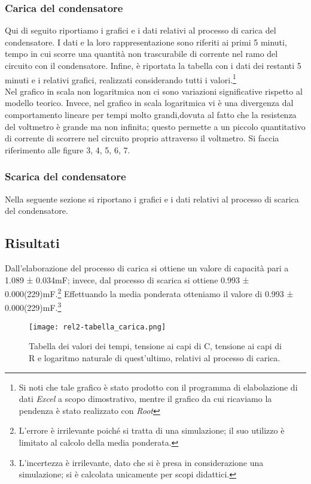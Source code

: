 \documentclass{article}
\begin{document}
\subsubsection{Carica del condensatore}
Qui di seguito riportiamo i grafici e i dati relativi al processo di carica del condensatore. I dati e la loro rappresentazione sono riferiti ai primi 5 minuti, tempo in cui scorre una quantità non trascurabile di corrente nel ramo del circuito con il condensatore. Infine, è riportata la tabella con i dati dei restanti 5 minuti e i relativi grafici, realizzati considerando tutti i valori.\footnote{Si noti che tale grafico è stato prodotto con il programma di elabolazione di dati \emph{Excel} a scopo dimostrativo, mentre il grafico da cui ricaviamo la pendenza è stato realizzato con \emph{Root}} \\ Nel grafico in scala non logaritmica non ci sono variazioni significative rispetto al modello teorico. Invece, nel grafico in scala logaritmica vi è una divergenza dal comportamento lineare per tempi molto grandi,dovuta al fatto che la resistenza del voltmetro è grande ma non infinita; questo permette a un piccolo quantitativo di corrente di scorrere nel circuito proprio attraverso il voltmetro. Si faccia riferimento alle figure 3, 4, 5, 6, 7.
\subsubsection{Scarica del condensatore}
Nella seguente sezione si riportano i grafici e i dati relativi al processo di scarica del condensatore.
\subsection{Risultati}
Dall’elaborazione del processo di carica si ottiene un valore di capacità pari a 1.089 ± 0.034mF; invece, dal processo di scarica si ottiene 0.993 ± 0.000(229)mF.\footnote{L’errore è irrilevante poiché si tratta di una simulazione; il suo utilizzo è limitato al calcolo della media ponderata.}
Effettuando la media ponderata otteniamo il valore di 0.993 ± 0.000(229)mF.\footnote{L’incertezza è irrilevante, dato che si è presa in considerazione una simulazione; si è calcolata unicamente per scopi didattici.}

\begin{figure}
    \centering
    \texttt{[image: rel2-tabella\_carica.png]}
    \caption{Tabella dei valori dei tempi, tensione ai capi di C, tensione ai capi di R e logaritmo naturale di quest’ultimo, relativi al processo di carica.}
    \label{figura3}
\end{figure}
\end{document}
